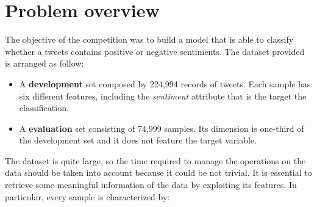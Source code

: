 \documentclass[conference]{IEEEtran}
\begin{document}
\section{Problem overview}\label{sec:overview}
The objective of the competition was to build a model that is able to classify whether a tweets contains positive or negative sentiments. The dataset provided is arranged as follow:
\begin{itemize}
    \item A \textbf{development} set composed by 224,994 records of tweets. Each sample has six different features, including the \textit{sentiment} attribute that is the target the classification.
    \item A \textbf{evaluation} set consisting of 74,999 samples. Its dimension is one-third of the development set and it does not feature the target variable.
\end{itemize}
The dataset is quite large, so the time required to manage the operations on the data should be taken into account because it could be not trivial. It is essential to retrieve some meaningful information of the data by exploiting its features. In particular, every sample is characterized by:
\end{document}
